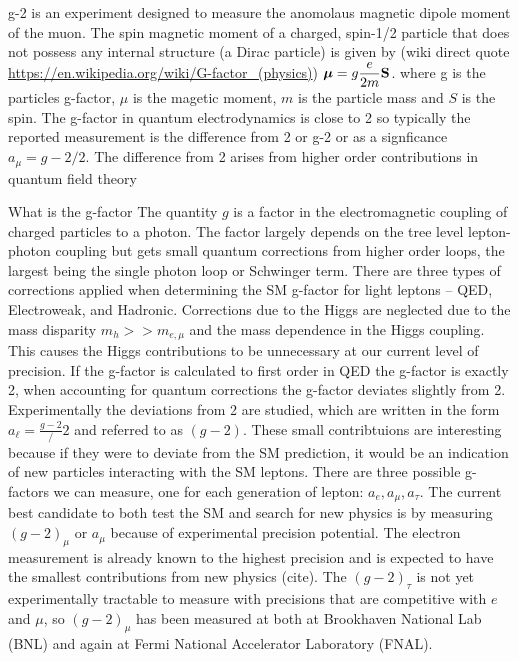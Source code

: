 g-2 is an experiment designed to measure the anomolaus magnetic dipole moment of the muon. The spin magnetic moment of a charged, spin-1/2 particle that does not possess any internal structure (a Dirac particle) is given by (wiki direct quote \url{https://en.wikipedia.org/wiki/G-factor_(physics)}) ${\displaystyle {\boldsymbol {\mu }}=g{e \over 2m}\mathbf {S} }$. where g is the particles g-factor, $\mu$ is the magetic moment, $m$ is the particle mass and $S$ is the spin. The g-factor in quantum electrodynamics is close to 2 so typically the reported measurement is the difference from 2 or g-2 or as a signficance $a_\mu = g-2/2$. The difference from 2 arises from higher order contributions in quantum field theory


What is the g-factor
The quantity $g$ is a factor in the electromagnetic coupling of charged particles to a photon. The factor largely depends on the tree level lepton-photon coupling but gets small quantum corrections from higher order loops, the largest being the single photon loop or Schwinger term. There are three types of corrections applied when determining the SM g-factor for light leptons -- QED, Electroweak, and Hadronic. Corrections due to the Higgs are neglected due to the mass disparity $m_h >> m_{e,\mu}$ and the mass dependence in the Higgs coupling. This causes the Higgs contributions to be unnecessary at our current level of precision. If the g-factor is calculated to first order in QED the g-factor is exactly 2, when accounting for quantum corrections the g-factor deviates slightly from 2. Experimentally the deviations from 2 are studied, which are written in the form $a_\ell = \frac{g-2}/2$ and referred to as $(g-2)$. These small contribtuions are interesting because if they were to deviate from the SM prediction, it would be an indication of new particles interacting with the SM leptons.  There are three possible g-factors we can measure, one for each generation of lepton: $a_e, a_\mu, a_\tau$. The current best candidate to both test the SM and search for new physics is by measuring $(g-2)_\mu$ or $a_\mu$ because of  experimental precision potential. The electron measurement is already known to the highest precision and is expected to have the smallest contributions from new physics (cite). The $(g-2)_\tau$ is not yet experimentally tractable to measure with precisions that are competitive with $e$ and $\mu$, so $(g-2)_\mu$ has been measured at both at Brookhaven National Lab (BNL) and again at Fermi National Accelerator Laboratory (FNAL).

